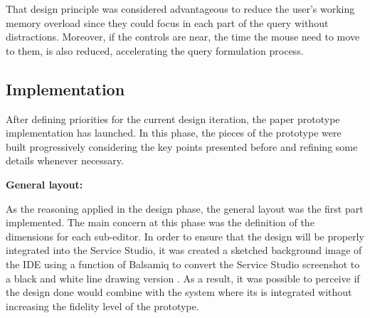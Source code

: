 That design principle was considered advantageous to reduce the user's working memory overload since they could focus in each part of the query without distractions. Moreover, if the controls are near, the time the mouse need to move to them, is also reduced, accelerating the query formulation process.




\subsection{Implementation}
\label{subsec:paper_prototype_implementation}

After defining priorities for the current design iteration, the paper prototype implementation has launched. In this phase, the pieces of the prototype were built progressively considering the key points presented before and refining some details whenever necessary.

\medskip

\textbf{General layout:}

\medskip

As the reasoning applied in the design phase, the general layout was the first part implemented. The main concern at this phase was the definition of the dimensions for each sub-editor. In order to ensure that the design will be properly integrated into the Service Studio, it was created a sketched background image of the \gls{IDE} using a function of Balsamiq \cite{balsamiq} to convert the Service Studio screenshot to a black and white line drawing version \cite{balsamiq_using_images_and_assets}. As a result, it was possible to perceive if the design done would combine with the system where its is integrated without increasing the fidelity level of the prototype.

